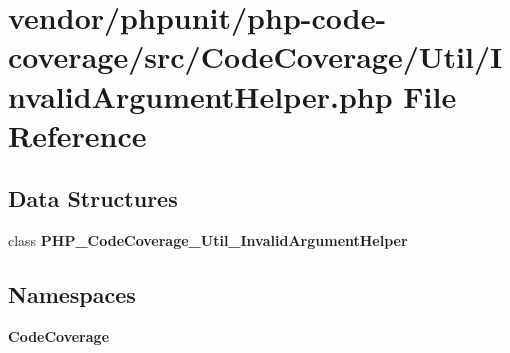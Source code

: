 \section{vendor/phpunit/php-\/code-\/coverage/src/\+Code\+Coverage/\+Util/\+Invalid\+Argument\+Helper.php File Reference}
\label{php-code-coverage_2src_2_code_coverage_2_util_2_invalid_argument_helper_8php}
\subsection*{Data Structures}
\begin{DoxyCompactItemize}
\item 
class {\bf P\+H\+P\+\_\+\+Code\+Coverage\+\_\+\+Util\+\_\+\+Invalid\+Argument\+Helper}
\end{DoxyCompactItemize}
\subsection*{Namespaces}
\begin{DoxyCompactItemize}
\item 
 {\bf Code\+Coverage}
\end{DoxyCompactItemize}

